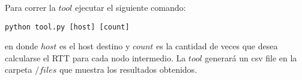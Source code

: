 Para correr la $tool$ ejecutar el siguiente comando:
\begin{verbatim}
python tool.py [host] [count]
\end{verbatim}
en donde $host$ es el host destino y $count$ es la cantidad de veces que desea calcularse el RTT para cada nodo intermedio. La $tool$ generará un csv file en la carpeta $/files$ que muestra los resultados obtenidos.